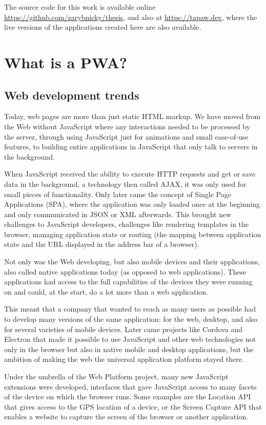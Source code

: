 \documentclass[english,zadani,odsaz]{fitthesis}
\begin{document}
The source code for this work is available online
\url{https://github.com/zarybnicky/thesis}, and also at \url{https://tapaw.dev}, where the
live versions of the applications created here are also available.

\chapter{What is a PWA?}
\label{sec:org0b3f122}
\section{Web development trends}
\label{sec:orgeba9d43}
Today, web pages are more than just static HTML markup. We have moved from the
Web without JavaScript where any interactions needed to be processed by the
server, through using JavaScript just for animations and small ease-of-use
features, to building entire applications in JavaScript that only talk to
servers in the background.

When JavaScript received the ability to execute HTTP requests and get or save
data in the background, a technology then called AJAX, it was only used for
small pieces of functionality. Only later came the concept of Single Page
Applications (SPA), where the application was only loaded once at the beginning
and only communicated in JSON or XML afterwards. This brought new challenges to
JavaScript developers, challenges like rendering templates in the browser,
managing application state or routing (the mapping between application state and
the URL displayed in the address bar of a browser).

Not only was the Web developing, but also mobile devices and their applications,
also called native applications today (as opposed to web applications). These
applications had access to the full capabilities of the devices they were
running on and could, at the start, do a lot more than a web application.

This meant that a company that wanted to reach as many users as possible had to
develop many versions of the same application: for the web, desktop, and also
for several varieties of mobile devices. Later came projects like Cordova
and Electron that made it possible to use JavaScript and other web technologies
not only in the browser but also in native mobile and desktop applications, but
the ambition of making the web the universal application platform stayed there.

Under the umbrella of the Web Platform project, many new JavaScript extensions
were developed, interfaces that gave JavaScript access to many facets of the
device on which the browser runs. Some examples are the Location API that gives
access to the GPS location of a device, or the Screen Capture API that enables a
website to capture the screen of the browser or another application.
\end{document}
